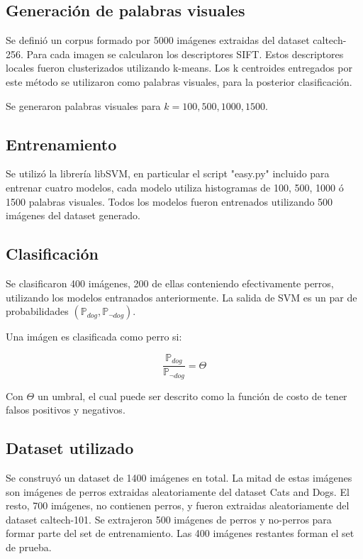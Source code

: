 \documentclass[12pt]{article}
\begin{document}
\subsection{Generación de palabras visuales}

Se definió un corpus formado por 5000 imágenes extraidas del dataset caltech-256. Para cada imagen se calcularon los descriptores SIFT.
Estos descriptores locales fueron clusterizados utilizando k-means. Los k centroides entregados por este método se utilizaron como
palabras visuales, para la posterior clasificación.

Se generaron palabras visuales para $k = 100, 500, 1000, 1500$.

\subsection{Entrenamiento}

Se utilizó la librería libSVM, en particular el script "easy.py" incluido para entrenar cuatro modelos, cada modelo utiliza histogramas de 100, 500, 1000 ó 1500
palabras visuales. Todos los modelos fueron entrenados utilizando 500 imágenes del dataset generado.

\subsection{Clasificación}

Se clasificaron 400 imágenes, 200 de ellas conteniendo efectivamente perros, utilizando los modelos entranados anteriormente. La salida de SVM es un par de probabilidades 
$(\mathbb{P}_{dog},\mathbb{P}_{\neg dog})$.

Una imágen es clasificada como perro si:

\begin{equation}
    \frac{ \mathbb{P}_{dog} }{ \mathbb{P}_{\neg dog} } =
    \Theta
\end{equation}

Con $\Theta$ un umbral, el cual puede ser descrito como la función de costo de tener falsos positivos y negativos.

\subsection{Dataset utilizado}
Se construyó un dataset de 1400 imágenes en total. La mitad de estas imágenes son imágenes de perros extraidas aleatoriamente del dataset Cats and Dogs. 
El resto, 700 imágenes, no contienen perros, y fueron extraidas aleatoriamente del dataset caltech-101.
Se extrajeron 500 imágenes de perros y no-perros para formar parte del set de entrenamiento.
Las 400 imágenes restantes forman el set de prueba.
\end{document}
